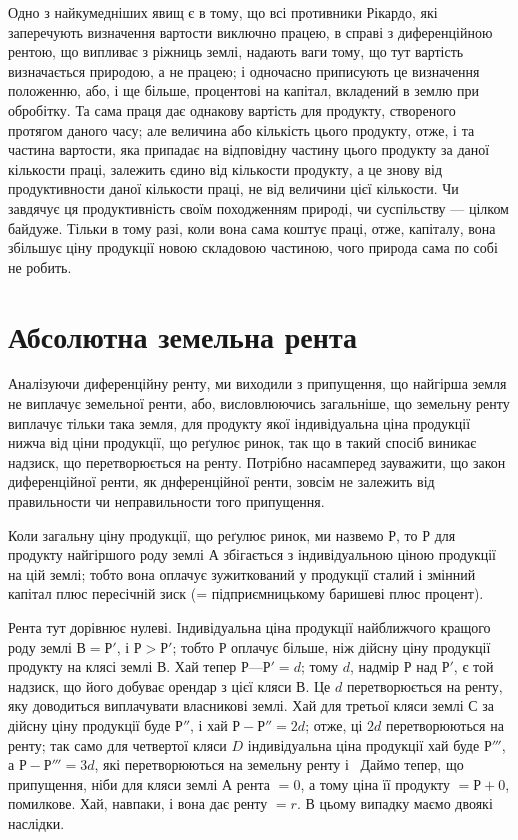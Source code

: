 
Одно з найкумедніших явищ є в тому, що всі противники Рікардо, які
заперечують визначення вартости виключно працею, в справі з диференційною
рентою, що випливає з ріжниць землі, надають ваги тому, що тут вартість
визначається природою, а не працею; і одночасно приписують це визначення
положенню, або, і ще більше, процентові на капітал, вкладений в землю при
обробітку. Та сама праця дає однакову вартість для продукту, створеного
протягом даного часу; але величина або кількість цього продукту, отже, і та
частина вартости, яка припадає на відповідну частину цього продукту за даної
кількости праці, залежить єдино від кількости продукту, а це знову від продуктивности
даної кількости праці, не від величини цієї кількости. Чи завдячує
ця продуктивність своїм походженням природі, чи суспільству — цілком байдуже.
Тільки в тому разі, коли вона сама коштує праці, отже, капіталу, вона
збільшує ціну продукції новою складовою частиною, чого природа сама по собі
не робить.

\section{Абсолютна земельна рента}

Аналізуючи диференційну ренту, ми виходили з припущення, що найгірша
земля не виплачує земельної ренти, або, висловлюючись загальніше, що земельну
ренту виплачує тільки така земля, для продукту якої індивідуальна ціна продукції
нижча від ціни продукції, що реґулює ринок, так що в такий спосіб
виникає надзиск, що перетворюється на ренту. Потрібно насамперед зауважити,
що закон диференційної ренти, як днференційної ренти, зовсім не залежить від
правильности чи неправильности того припущення.

Коли загальну ціну продукції, що реґулює ринок, ми назвемо $Р$, то $Р$ для
продукту найгіршого роду землі $А$ збігається з індивідуальною ціною продукції
на цій землі; тобто вона оплачує зужиткований у продукції сталий і змінний капітал
плюс пересічній зиск (= підприємницькому баришеві плюс процент).

Рента тут дорівнює нулеві. Індивідуальна ціна продукції найближчого
кращого роду землі $В = Р'$, і $Р>Р'$; тобто $Р$ оплачує більше, ніж дійсну
ціну продукції продукту на клясі землі $В$. Хай тепер $Р — Р' = d$; тому
$d$, надмір $Р$ над $Р'$, є той надзиск, що його добуває орендар з цієї кляси $В$.
Це $d$ перетворюється на ренту, яку доводиться виплачувати власникові землі.
Хай для третьої кляси землі $С$ за дійсну ціну продукції буде $Р''$, і хай
$Р - Р'' = 2d$; отже, ці $2d$ перетворюються на ренту; так само для четвертої кляси
$D$ індивідуальна ціна продукції хай буде $Р'''$, а $Р - Р''' = 3d$, які перетворюються
на земельну ренту і~ Даймо тепер, що припущення, ніби для
кляси землі $А$ рента $= 0$, а тому ціна її продукту $= Р + 0$, помилкове. Хай,
навпаки, і вона дає ренту $= r$. В цьому випадку маємо двоякі наслідки.

